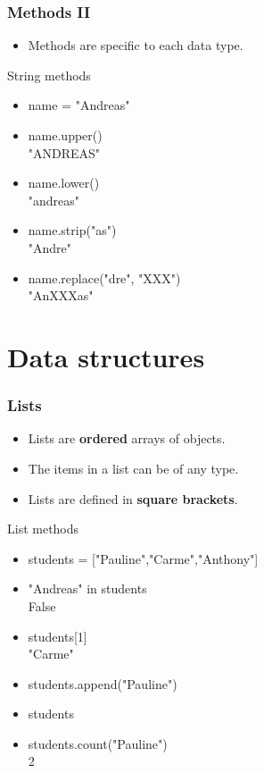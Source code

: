 \documentclass[]{beamer}
\begin{document}

\begin{frame}
\frametitle{Methods II}

\begin{itemize}
\item Methods are specific to each data type.
\end{itemize}
\vspace{1cm}

\begin{block}{String methods}
\begin{itemize}
\item name = "Andreas"
\item name.upper()
\\ "ANDREAS"
\item name.lower()
\\ "andreas"
\item name.strip("as")
\\ "Andre"
\item name.replace("dre", "XXX")
\\ "AnXXXas"
\end{itemize}
\end{block}

\end{frame}


\section{Data structures}

\begin{frame}
\frametitle{Lists}

\begin{itemize}
\item Lists are \textbf{ordered} arrays of objects.
\item The items in a list can be of any type.
\item Lists are defined in \textbf{square brackets}.
\end{itemize}

\pause

\begin{block}{List methods}
\begin{itemize}
\item students = ["Pauline","Carme","Anthony"]
\item "Andreas" in students
\\ False
\item students[1]
\\"Carme"
\item students.append("Pauline")
\item students 
\item students.count("Pauline")
\\ 2
\end{itemize}
\end{block}

\end{frame}
\end{document}
